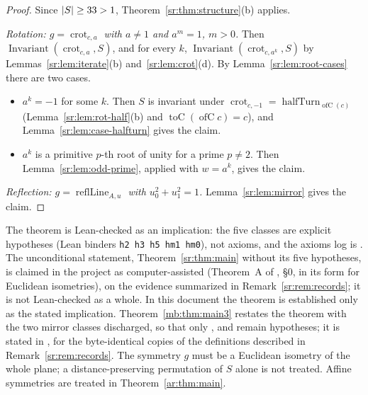 \begin{proof}
Since $\lvert S\rvert\ge33>1$, Theorem~\ref{sr:thm:structure}(b) applies.

\emph{Rotation: $g=\operatorname{crot}_{c,a}$ with $a\ne1$ and $a^m=1$, $m>0$.} Then
$\operatorname{Invariant}(\operatorname{crot}_{c,a},S)$, and for every $k$,
$\operatorname{Invariant}(\operatorname{crot}_{c,a^k},S)$ by Lemmas~\ref{sr:lem:iterate}(b) and~\ref{sr:lem:crot}(d).
By Lemma~\ref{sr:lem:root-cases} there are two cases.
\begin{itemize}
\item $a^k=-1$ for some $k$. Then $S$ is invariant under $\operatorname{crot}_{c,-1}=
  \operatorname{halfTurn}_{\operatorname{ofC}(c)}$ (Lemma~\ref{sr:lem:rot-half}(b) and
  $\operatorname{toC}(\operatorname{ofC}c)=c$), and Lemma~\ref{sr:lem:case-halfturn} gives the claim.
\item $a^k$ is a primitive $p$-th root of unity for a prime $p\ne2$. Then Lemma~\ref{sr:lem:odd-prime}, applied with
  $w=a^k$, gives the claim.
\end{itemize}

\emph{Reflection: $g=\operatorname{reflLine}_{A,u}$ with $u_0^2+u_1^2=1$.} Lemma~\ref{sr:lem:mirror} gives the claim.
\end{proof}

\begin{remark}\label{sr:rem:main}
The theorem is Lean-checked as an implication: the five classes are explicit hypotheses (Lean binders
\texttt{h2 h3 h5 hm1 hm0}), not axioms, and the axioms log is . The
unconditional statement, Theorem~\ref{sr:thm:main} without its five hypotheses, is claimed in the project as
computer-assisted (Theorem~A of , \S0, in its form for Euclidean isometries), on the
evidence summarized in Remark~\ref{sr:rem:records}; it is not Lean-checked as a whole. In this document the theorem is
established only as the stated implication. Theorem~\ref{mb:thm:main3} restates the theorem with the two mirror
classes discharged, so that only ,  and  remain hypotheses; it is
stated in , for the byte-identical copies of the definitions described
in Remark~\ref{sr:rem:records}. The
symmetry $g$ must be a Euclidean isometry of the whole plane; a distance-preserving permutation of $S$ alone is not
treated. Affine symmetries are treated in Theorem~\ref{ar:thm:main}.
\end{remark}

